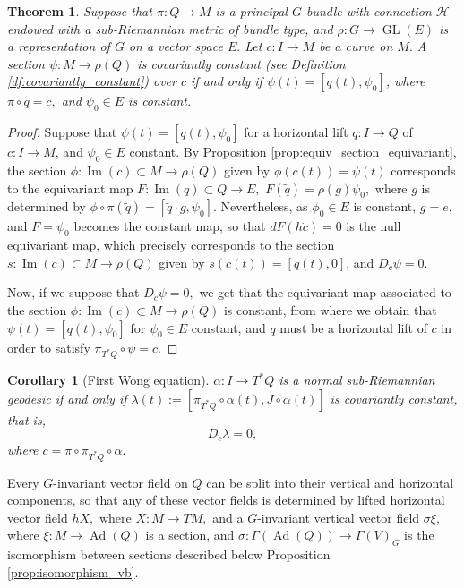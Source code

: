 \documentclass[12pt, letterpaper, reqno]{amsart}
\theoremstyle{definition}
\theoremstyle{plain}
\newtheorem{thm}{Theorem}
\newtheorem{cor}{Corollary}
\theoremstyle{remark}
\begin{document}
\begin{thm}
	Suppose that $ \pi: Q \rightarrow M $  is a principal $ G $-bundle with connection $ \mathcal{H} $ endowed with a sub-Riemannian metric of bundle type,  and $ \rho: G \rightarrow \operatorname{GL} (E) $ is a representation of $ G $ on a vector space $ E. $ Let $ c: I \rightarrow M $ be a curve on $ M. $ A section $ \psi: M \rightarrow \rho(Q) $   is covariantly constant (see Definition \ref{df:covariantly_constant}) over $ c $  if and only if $ \psi(t)= [q(t), \psi_0] $, where $ \pi\circ q = c,  $ and $ \psi_0\in E $ is constant.
\end{thm}
\begin{proof}
	Suppose that $ \psi(t)= [q(t), \psi_0] $ for a horizontal lift $ q: I \rightarrow Q $ of $ c: I \rightarrow M $, and $ \psi_0\in E $ constant. By Proposition \ref{prop:equiv_section_equivariant}, the section $ \phi: \operatorname{Im} (c)\subset M \rightarrow \rho(Q) $ given by $ \phi(c(t))=\psi(t) $ corresponds to the equivariant map $ F: \operatorname{Im} (q)  \subset Q \rightarrow E, $ $ F(\tilde q)= \rho(g)\psi_0, $ where $ g $ is determined by $ \phi\circ\pi(\tilde q) = [\tilde q \cdot g, \psi_0]. $ Nevertheless, as $ \phi_0\in E $ is constant, $ g=e, $ and $ F=\psi_0 $ becomes the constant map, so that $ dF(h\dot{c})=0 $ is the null equivariant map, which precisely corresponds to the section $ s: \operatorname{Im} (c) \subset M \rightarrow \rho(Q) $ given by $ s(c(t)) =[q(t), 0] $, and $ D_{\dot{c}}\psi=0. $ 

	Now, if we suppose that $ D_{\dot{c}}\psi=0, $ we get that the equivariant map associated to the section $ \phi: \operatorname{Im} (c)\subset M \rightarrow \rho(Q) $ is constant, from where we obtain that $ \psi(t)=[q(t), \psi_0] $ for $ \psi_0\in E $ constant, and $ q $ must be a horizontal lift of $ c $ in order to satisfy $ \pi_{T^*Q}\circ\psi =c. $ 
\end{proof}

\begin{cor}[First Wong equation]\label{cor:fwe}
	$\alpha: I \rightarrow T^*Q$ is a normal sub-Riemannian geodesic if and only if $ \lambda(t):=[ \pi_{T^*Q}\circ\alpha(t), J\circ\alpha(t)]$ is covariantly constant, that is, $$ D_{\dot{c}}\lambda =0, $$ where $ c=\pi\circ\pi_{T^*Q}\circ\alpha. $ 
\end{cor}
Every $ G $-invariant vector field on $ Q $ can be split into their vertical and horizontal components, so that any of these vector fields is determined by lifted horizontal vector field $ hX, $ where $ X: M \rightarrow TM, $ and a $ G $-invariant vertical vector field $ \sigma\xi, $ where $ \xi: M \rightarrow \operatorname{Ad} (Q) $ is a section, and $ \sigma: \Gamma( \operatorname{Ad} (Q)) \rightarrow \Gamma(V)_G $ is the isomorphism between sections described below Proposition \ref{prop:isomorphism_vb}.
\end{document}
